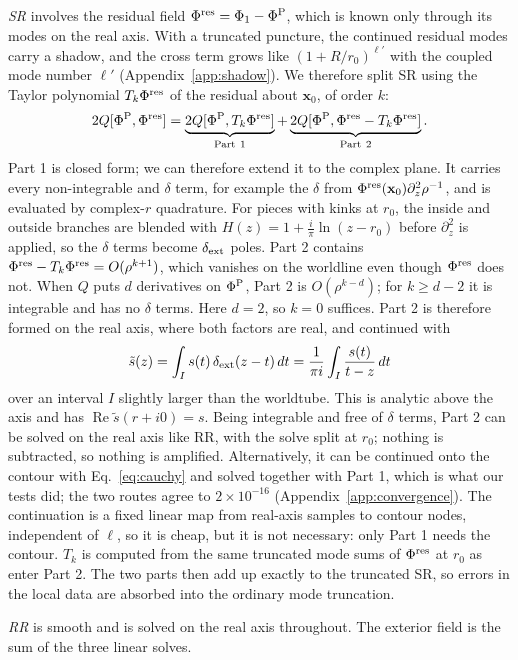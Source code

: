 \documentclass[aps,prl,twocolumn,superscriptaddress,nofootinbib,floatfix]{revtex4-2}
\renewcommand{\Re}{\operatorname{Re}}
\newcommand{\dext}{\delta_{\rm ext}}
\newcommand{\PhiP}{\Phi^{\rm P}}
\newcommand{\Pres}{\Phi^{\rm res}}
\newcommand{\x}{\mathbf{x}}
\begin{document}
\emph{SR} involves the residual field $\Pres=\Phi_1-\PhiP$, which is known only through its modes on the real axis.
With a truncated puncture, the continued residual modes carry a shadow, and the cross term grows like $(1+R/r_0)^{\ell'}$ with the coupled mode number $\ell'$ (Appendix~\ref{app:shadow}).
We therefore split SR using the Taylor polynomial $T_k\Pres$ of the residual about $\x_0$, of order $k$:
\begin{equation}
2Q[\PhiP,\Pres]=\underbrace{2Q[\PhiP,T_k\Pres]}_{\rm Part\ 1}+\underbrace{2Q[\PhiP,\Pres-T_k\Pres]}_{\rm Part\ 2}.
\label{eq:hybrid}
\end{equation}
Part 1 is closed form; we can therefore extend it to the complex plane. It carries every non-integrable and $\delta$ term, for example the $\delta$ from $\Pres(\x_0)\partial_z^2\rho^{-1}$, and is evaluated by complex-$r$ quadrature.
For pieces with kinks at $r_0$, the inside and outside branches are blended with $H(z)=1+\tfrac{i}{\pi}\ln(z-r_0)$ before $\partial_z^2$ is applied, so the $\delta$ terms become $\dext$ poles.
Part 2 contains $\Pres-T_k\Pres=O(\rho^{k+1})$, which vanishes on the worldline even though $\Pres$ does not.
When $Q$ puts $d$ derivatives on $\PhiP$, Part 2 is $O(\rho^{k-d})$; for $k\ge d-2$ it is integrable and has no $\delta$ terms.
Here $d=2$, so $k=0$ suffices.
Part 2 is therefore formed on the real axis, where both factors are real, and continued with
\begin{equation}
\tilde s(z)=\int_I s(t)\,\dext(z-t)\,dt=\frac{1}{\pi i}\int_I\frac{s(t)}{t-z}\,dt
\label{eq:cauchy}
\end{equation}
over an interval $I$ slightly larger than the worldtube. This is analytic above the axis and has $\Re\tilde s(r+i0)=s$.
Being integrable and free of $\delta$ terms, Part 2 can be solved on the real axis like RR, with the solve split at $r_0$; nothing is subtracted, so nothing is amplified.
Alternatively, it can be continued onto the contour with Eq.~\eqref{eq:cauchy} and solved together with Part 1, which is what our tests did; the two routes agree to $2\times10^{-16}$ (Appendix~\ref{app:convergence}).
The continuation is a fixed linear map from real-axis samples to contour nodes, independent of $\ell$, so it is cheap, but it is not necessary: only Part 1 needs the contour.
$T_k$ is computed from the same truncated mode sums of $\Pres$ at $r_0$ as enter Part 2.
The two parts then add up exactly to the truncated SR, so errors in the local data are absorbed into the ordinary mode truncation.

\emph{RR} is smooth and is solved on the real axis throughout.
The exterior field is the sum of the three linear solves.
\end{document}
